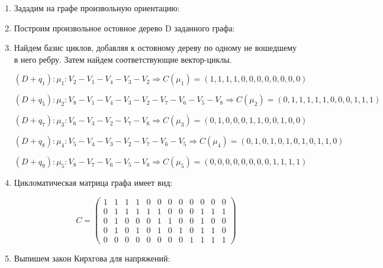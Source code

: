\begin{enumerate}
  \item Зададим на графе произвольную ориентацию:


  \item Построим произвольное остовное дерево D заданного графа:


  \newpage

  \item Найдем базис циклов, добавляя к остовному дереву по одному не вошедшему в него ребру. Затем найдем соответствующие вектор-циклы.

  $(D+q_1):\mu_1:V_2-V_1-V_4-V_3-V_2\Longrightarrow C(\mu_1)=(1,1,1,1,0,0,0,0,0,0,0,0)$

  $(D+q_5):\mu_2:V_8-V_1-V_4-V_3-V_2-V_7-V_6-V_5-V_8\Longrightarrow C(\mu_2)=(0,1,1,1,1,1,0,0,0,1,1,1)$

  $(D+q_7):\mu_3:V_6-V_3-V_2-V_7-V_6\Longrightarrow C(\mu_3)=(0,1,0,0,0,1,1,0,0,1,0,0)$

  $(D+q_8):\mu_4:V_5-V_4-V_3-V_2-V_7-V_6-V_5\Longrightarrow C(\mu_4)=(0,1,0,1,0,1,0,1,0,1,1,0)$

  $(D+q_9):\mu_5:V_8-V_7-V_6-V_5-V_8\Longrightarrow C(\mu_5)=(0,0,0,0,0,0,0,0,1,1,1,1)$

  \item Цикломатическая матрица графа имеет вид:

  $$C=\left( \begin{array}{*{12}{c}}1 & 1 & 1 & 1 & 0 & 0 & 0 & 0 & 0 & 0 & 0 & 0\\0 & 1 & 1 & 1 & 1 & 1 & 0 & 0 & 0 & 1 & 1 & 1\\0 & 1 & 0 & 0 & 0 & 1 & 1 & 0 & 0 & 1 & 0 & 0\\0 & 1 & 0 & 1 & 0 & 1 & 0 & 1 & 0 & 1 & 1 & 0\\0 & 0 & 0 & 0 & 0 & 0 & 0 & 0 & 1 & 1 & 1 & 1 \end{array} \right)$$

  \item Выпишем закон Кирхгова для напряжений:


\end{enumerate}
